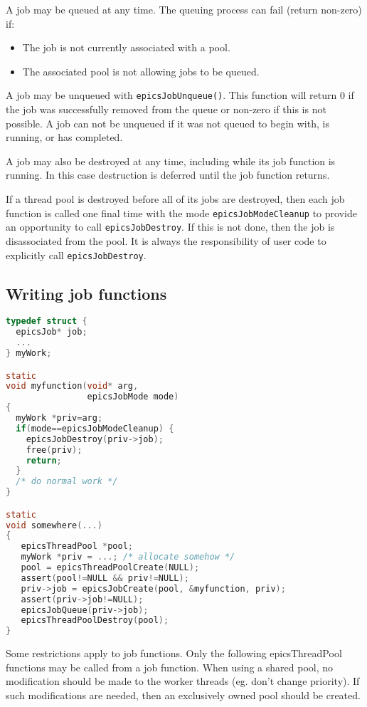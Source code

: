 A job may be queued at any time. The queuing process can fail (return
non-zero) if:

\begin{itemize}
\item The job is not currently associated with a pool.
\item The associated pool is not allowing jobs to be queued.
\end{itemize}

A job may be unqueued with \verb|epicsJobUnqueue()|. This function will return
0 if the job was successfully removed from the queue or non-zero if this is
not possible. A job can not be unqueued if it was not queued to begin
with, is running, or has completed.

A job may also be destroyed at any time, including while its job function
is running. In this case destruction is deferred until the job function returns.

If a thread pool is destroyed before all of its jobs are destroyed,
then each job function is called one final time with the mode \verb|epicsJobModeCleanup|
to provide an opportunity to call \verb|epicsJobDestroy|.
If this is not done, then the job is disassociated from the pool.
It is always the responsibility of user code to explicitly call \verb|epicsJobDestroy|.

\subsection{Writing job functions}

\begin{lstlisting}[language=C]
typedef struct {
  epicsJob* job;
  ...
} myWork;

static
void myfunction(void* arg,
                epicsJobMode mode)
{
  myWork *priv=arg;
  if(mode==epicsJobModeCleanup) {
    epicsJobDestroy(priv->job);
    free(priv);
    return;
  }
  /* do normal work */
}

static
void somewhere(...)
{
   epicsThreadPool *pool;
   myWork *priv = ...; /* allocate somehow */
   pool = epicsThreadPoolCreate(NULL);
   assert(pool!=NULL && priv!=NULL);
   priv->job = epicsJobCreate(pool, &myfunction, priv);
   assert(priv->job!=NULL);
   epicsJobQueue(priv->job);
   epicsThreadPoolDestroy(pool);
}
\end{lstlisting}


Some restrictions apply to job functions. Only the following epicsThreadPool
functions may be called from a job function. When using a shared pool,
no modification should be made to the worker threads (eg. don't change
priority). If such modifications are needed, then an exclusively owned
pool should be created.

